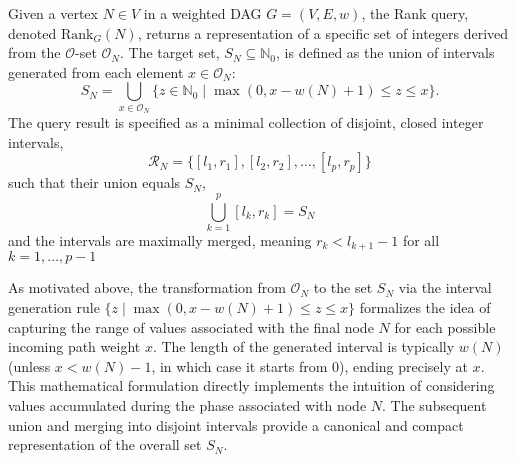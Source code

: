\begin{definition}
    \label{def:rank_dag}
    Given a vertex $N \in V$ in a weighted DAG $G=(V, E, w)$, the Rank query, denoted $\mathrm{Rank}_G(N)$, returns a representation of a specific set of integers derived from the $\mathcal{O}$-set $\mathcal{O}_N$. The target set, $S_N \subseteq \mathbb{N}_0$, is defined as the union of intervals generated from each element $x \in \mathcal{O}_N$:
    \[ S_N = \bigcup_{x \in \mathcal{O}_N} \{ z \in \mathbb{N}_0 \mid \max(0, x - w(N) + 1) \le z \le x \}. \]
    The query result is specified as a minimal collection of disjoint, closed integer intervals,
    \[ \mathcal{R}_N = \{[l_1, r_1], [l_2, r_2], \dots, [l_p, r_p]\} \]
    such that their union equals $S_N$,
    \[ \bigcup_{k=1}^{p} [l_k, r_k] = S_N \]
    and the intervals are maximally merged, meaning $r_k < l_{k+1}-1$ for all $k=1, \dots, p-1$
\end{definition}

\begin{remark}
    As motivated above, the transformation from $\mathcal{O}_N$ to the set $S_N$ via the interval generation rule $\{ z \mid \max(0, x - w(N) + 1) \le z \le x \}$ formalizes the idea of capturing the range of values associated with the final node $N$ for each possible incoming path weight $x$. The length of the generated interval is typically $w(N)$ (unless $x < w(N)-1$, in which case it starts from 0), ending precisely at $x$. This mathematical formulation directly implements the intuition of considering values accumulated during the phase associated with node $N$. The subsequent union and merging into disjoint intervals provide a canonical and compact representation of the overall set $S_N$.
\end{remark}

